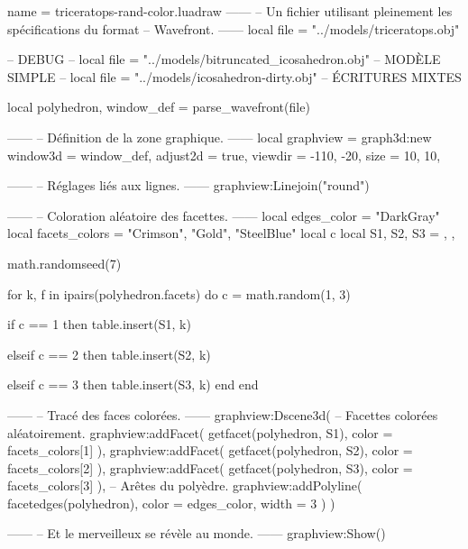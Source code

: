 \documentclass{standalone}
\begin{document}
\begin{luadraw}{name = triceratops-rand-color.luadraw}
------
-- Un fichier utilisant pleinement les spécifications du format
-- Wavefront.
------
local file = "../models/triceratops.obj"

-- DEBUG
-- local file = "../models/bitruncated_icosahedron.obj" -- MODÈLE SIMPLE
-- local file = "../models/icosahedron-dirty.obj" -- ÉCRITURES MIXTES

local polyhedron, window_def = parse_wavefront(file)

------
-- Définition de la zone graphique.
------
local graphview = graph3d:new{
  window3d = window_def,
  adjust2d = true,
  viewdir  = {-110, -20},
  size     = {10, 10},
}

------
-- Réglages liés aux lignes.
------
graphview:Linejoin("round")

------
-- Coloration aléatoire des facettes.
------
local edges_color   = "DarkGray"
local facets_colors = {"Crimson", "Gold", "SteelBlue"}
local c
local S1, S2, S3 = {}, {}, {}

math.randomseed(7)

for k, f in ipairs(polyhedron.facets) do
  c = math.random(1, 3)

  if c == 1 then
    table.insert(S1, k)

  elseif c == 2 then
    table.insert(S2, k)

  elseif c == 3 then
    table.insert(S3, k)
  end
end

------
-- Tracé des faces colorées.
------
graphview:Dscene3d(
-- Facettes colorées aléatoirement.
  graphview:addFacet(
    getfacet(polyhedron, S1),
    {
      color = facets_colors[1]
    }),
  graphview:addFacet(
    getfacet(polyhedron, S2),
    {
      color = facets_colors[2]
    }),
  graphview:addFacet(
    getfacet(polyhedron, S3),
    {
      color = facets_colors[3]
    }),
-- Arêtes du polyèdre.
  graphview:addPolyline(
    facetedges(polyhedron),
    {
      color = edges_color,
      width = 3
    })
)

------
-- Et le merveilleux se révèle au monde.
------
graphview:Show()
\end{luadraw}
\end{document}
